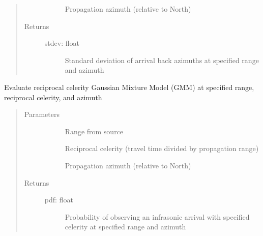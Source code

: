\documentclass[letterpaper,10pt,english]{sphinxmanual}
\begin{document}
\begin{fulllineitems}
\begin{fulllineitems}
\begin{quote}
\begin{description}
\begin{description}
\item[{}] \leavevmode
\sphinxAtStartPar
Propagation azimuth (relative to North)

\end{description}

\item[{Returns}] \leavevmode\begin{description}
\item[{stdev: float}] \leavevmode
\sphinxAtStartPar
Standard deviation of arrival back azimuths at specified range and azimuth

\end{description}

\end{description}\end{quote}

\end{fulllineitems}


\begin{fulllineitems}
\label{\detokenize{stochprop.propagation:stochprop.propagation.PathGeometryModel.eval_rcel_gmm}}
\sphinxAtStartPar
Evaluate reciprocal celerity Gaussian Mixture Model (GMM)
at specified range, reciprocal celerity, and azimuth
\begin{quote}\begin{description}
\item[{Parameters}] \leavevmode\begin{description}
\item[{}] \leavevmode
\sphinxAtStartPar
Range from source

\item[{}] \leavevmode
\sphinxAtStartPar
Reciprocal celerity (travel time divided by propagation range)

\item[{}] \leavevmode
\sphinxAtStartPar
Propagation azimuth (relative to North)

\end{description}

\item[{Returns}] \leavevmode\begin{description}
\item[{pdf: float}] \leavevmode
\sphinxAtStartPar
Probability of observing an infrasonic arrival with specified celerity at specified range and azimuth


\end{description}
\end{description}
\end{quote}
\end{fulllineitems}
\end{fulllineitems}
\end{document}
